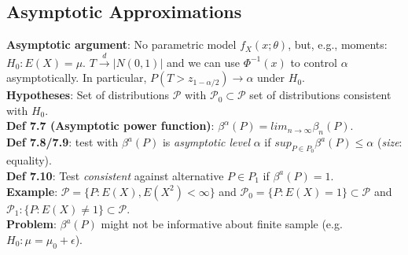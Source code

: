 \subsection{Asymptotic Approximations}
\textbf{Asymptotic argument}: No parametric model $f_X(x;\theta)$, but, e.g., moments: $H_0: E(X) = \mu$. $T\xrightarrow{d}|N(0,1)|$ and we can use $\Phi^{-1}(x)$ to control $\alpha$ asymptotically. In particular, $P(T>z_{1-\alpha/2})\rightarrow \alpha$ under $H_0$.\\ 
\textbf{Hypotheses}: Set of distributions $\mathcal{P}$ with $\mathcal{P}_0\subset\mathcal{P}$ set of distributions consistent with $H_0$.\\
\textbf{Def 7.7 (Asymptotic power function)}: $\beta^\alpha(P) = lim_{n\to\infty}\beta_n(P)$.\\
\textbf{Def 7.8/7.9}: test with $\beta^a(P)$ is \emph{asymptotic level} $\alpha$ if $sup_{P\in P_0}\beta^a(P)\leq\alpha$ (\emph{size}: equality).\\
\textbf{Def 7.10}: Test \emph{consistent} against alternative $P\in P_1$ if $\beta^a(P) = 1$.\\
\textbf{Example}: $\mathcal{P} = \{P: E(X), E(X^2) < \infty\}$ and $\mathcal{P}_0 = \{P: E(X) = 1\} \subset \mathcal{P}$ and $\mathcal{P}_1: \{P: E(X) \neq 1\} \subset \mathcal{P}$.\\
\textbf{Problem}: $\beta^a(P)$ might not be informative about finite sample (e.g. $H_0:\mu=\mu_0+\epsilon$). 